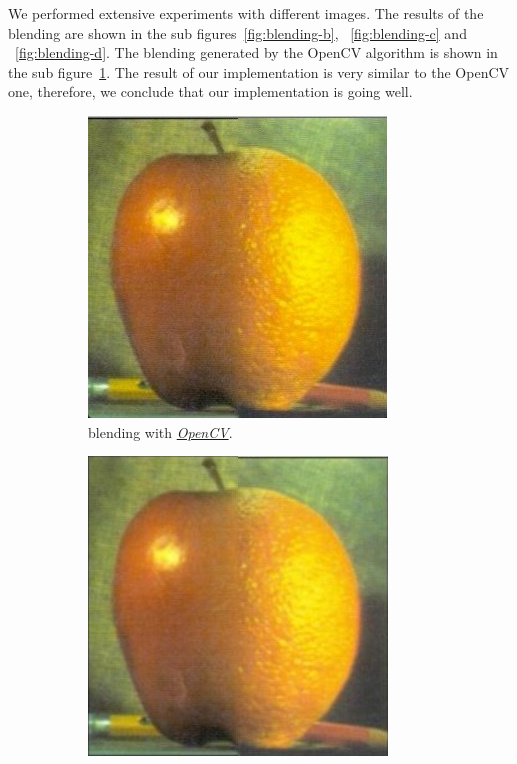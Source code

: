 We performed extensive experiments with different images. The results of the blending are shown in the sub figures~\ref{fig:blending-b}, ~\ref{fig:blending-c} and ~\ref{fig:blending-d}. The blending generated by the OpenCV algorithm is shown in the sub figure~\ref{fig:blending-a}. The result of our implementation is very similar to the OpenCV one, therefore, we conclude that our implementation is going well.

\begin{figure}[h!]
\centering
\begin{subfigure}{0.33\textwidth}
  \centering
  \includegraphics[width=0.8\linewidth]{output/blendedOpenCV.jpg}
  \caption{blending with \href{http://docs.opencv.org/3.1.0/dc/dff/tutorial_py_pyramids.html}{\textit{OpenCV}}.}
  \label{fig:blending-a}
\end{subfigure}%
\begin{subfigure}{0.33\textwidth}
  \centering
  \includegraphics[width=0.8\linewidth]{output/blending1.jpg}

\end{subfigure}
\end{figure}
